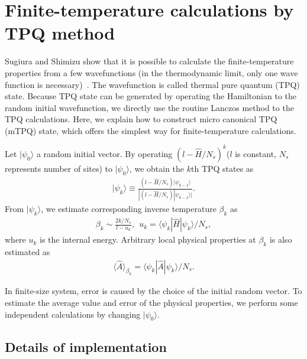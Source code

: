 \section{Finite-temperature calculations by TPQ method}
\label{Ch:TPQ}
Sugiura and Shimizu show that
it is possible to calculate the finite-temperature properties
from a few wavefunctions (in the thermodynamic limit, only one wave function is necessary)~\cite{Sugiura2012}.
The wavefunction is called thermal pure quantum (TPQ) state.
Because TPQ state can be generated by operating the Hamiltonian 
to the random initial wavefunction,
we directly use the routine Lanczos method to the TPQ calculations.
Here, we explain how to construct micro canonical TPQ (mTPQ) state,
which offers the simplest way for finite-temperature calculations.

Let $|\psi_{0}\rangle$ a random initial vector.
By operating $(l-\hat{H}/N_{s})^{k}$($l$ is constant, 
$N_{s}$ represents number of sites) 
to $|\psi_{0}\rangle$,
we obtain the $k$th TPQ states as
\begin{align}
|\psi_{k}\rangle \equiv \frac{(l-\hat{H}/N_{s})|\psi_{k-1}\rangle}{|(l-\hat{H}/N_{s})|\psi_{k-1}\rangle|}.
\end{align}
From  $|\psi_{k}\rangle$, we estimate corresponding inverse temperature $\beta_{k}$ as
\begin{align}
\beta_{k}\sim \frac{2k/N_{s}}{l-u_{k}},~~
u_{k} = \langle \psi_{k}|\hat{H}|\psi_{k}\rangle/N_{s},
\end{align}
where $u_{k}$ is the internal energy.
Arbitrary local physical properties at $\beta_{k}$ is also estimated as
\begin{align}
\langle \hat{A}\rangle_{\beta_{k}} =  \langle \psi_{k}|\hat{A}|\psi_{k}\rangle/N_{s}.
\end{align}

In finite-size system,
error is caused by the choice of the initial random vector.
To estimate the average value and error of the physical properties,
we perform some independent calculations by changing $|\psi_{0}\rangle$.

\subsection{Details of implementation}
